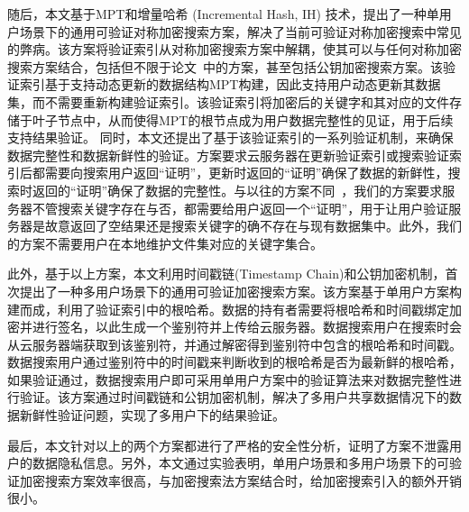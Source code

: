 随后，本文基于MPT和增量哈希 (Incremental Hash, IH) 技术，提出了一种单用户场景下的通用可验证对称加密搜索方案，解决了当前可验证对称加密搜索中常见的弊病。该方案将验证索引从对称加密搜索方案中解耦，使其可以与任何对称加密搜索方案结合，包括但不限于论文~\cite{stefanov2014practical,cash2014dynamic,kamara2012dynamic}中的方案，甚至包括公钥加密搜索方案。该验证索引基于支持动态更新的数据结构MPT构建，因此支持用户动态更新其数据集，而不需要重新构建验证索引。该验证索引将加密后的关键字和其对应的文件存储于叶子节点中，从而使得MPT的根节点成为用户数据完整性的见证，用于后续支持结果验证。
同时，本文还提出了基于该验证索引的一系列验证机制，来确保数据完整性和数据新鲜性的验证。方案要求云服务器在更新验证索引或搜索验证索引后都需要向搜索用户返回“证明”，更新时返回的“证明”确保了数据的新鲜性，搜索时返回的“证明”确保了数据的完整性。与以往的方案不同~\cite{kamara2011cs2,kurosawa2013update,stefanov2014practical}，我们的方案要求服务器不管搜索关键字存在与否，都需要给用户返回一个“证明”，用于让用户验证服务器是故意返回了空结果还是搜索关键字的确不存在与现有数据集中。此外，我们的方案不需要用户在本地维护文件集对应的关键字集合。

此外，基于以上方案，本文利用时间戳链(Timestamp Chain)和公钥加密机制，首次提出了一种多用户场景下的通用可验证加密搜索方案。该方案基于单用户方案构建而成，利用了验证索引中的根哈希。数据的持有者需要将根哈希和时间戳绑定加密并进行签名，以此生成一个鉴别符并上传给云服务器。数据搜索用户在搜索时会从云服务器端获取到该鉴别符，并通过解密得到鉴别符中包含的根哈希和时间戳。数据搜索用户通过鉴别符中的时间戳来判断收到的根哈希是否为最新鲜的根哈希，如果验证通过，数据搜索用户即可采用单用户方案中的验证算法来对数据完整性进行验证。该方案通过时间戳链和公钥加密机制，解决了多用户共享数据情况下的数据新鲜性验证问题，实现了多用户下的结果验证。

最后，本文针对以上的两个方案都进行了严格的安全性分析，证明了方案不泄露用户的数据隐私信息。另外，本文通过实验表明，单用户场景和多用户场景下的可验证加密搜索方案效率很高，与加密搜索法方案结合时，给加密搜索引入的额外开销很小。


